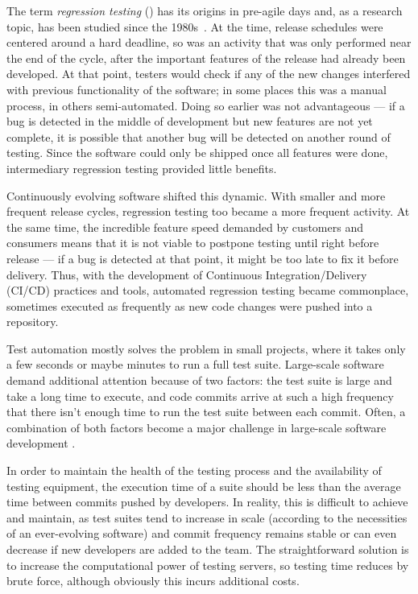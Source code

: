 The term \textit{regression testing} (\rt) has its origins in pre-agile days and, as a research topic, has been studied since the 1980s~\cite{leung1989insights,yoo2012regression}.
At the time, release schedules were centered around a hard deadline, so \rt was an activity that was only performed near the end of the cycle, after the important features of the release had already been developed.
At that point, testers would check if any of the new changes interfered with previous functionality of the software; in some places this was a manual process, in others semi-automated.
Doing so earlier was not advantageous — if a bug is detected in the middle of development but new features are not yet complete, it is possible that another bug will be detected on another round of testing.
Since the software could only be shipped once all features were done, intermediary regression testing provided little benefits.

Continuously evolving software shifted this dynamic.
With smaller and more frequent release cycles, regression testing too became a more frequent activity.
At the same time, the incredible feature speed demanded by customers and consumers means that it is not viable to postpone testing until right before release — if a bug is detected at that point, it might be too late to fix it before delivery.
Thus, with the development of Continuous Integration/Delivery (CI/CD) practices and tools, automated regression testing became commonplace, sometimes executed as frequently as new code changes were pushed into a repository.

Test automation mostly solves the problem in small projects, where it takes only a few seconds or maybe minutes to run a full test suite.
Large-scale software demand additional attention because of two factors: the test suite is large and take a long time to execute, and code commits arrive at such a high frequency that there isn't enough time to run the test suite between each commit.
Often, a combination of both factors become a major challenge in large-scale software development \cite{memon_taming_2017}.

In order to maintain the health of the testing process and the availability of testing equipment, the execution time of a suite should be less than the average time between commits pushed by developers.
In reality, this is difficult to achieve and maintain, as test suites tend to increase in scale (according to the necessities of an ever-evolving software) and commit frequency remains stable or can even decrease if new developers are added to the team.
The straightforward solution is to increase the computational power of testing servers, so testing time reduces by brute force, although obviously this incurs additional costs.

